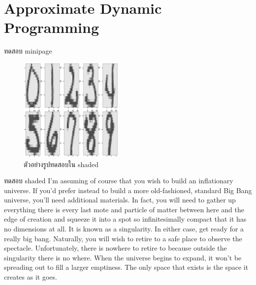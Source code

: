 \chapter{Approximate Dynamic Programming}
\label{chapter: ADP}





\begin{minipage}{5in} 
ทดสอบ minipage
\end{minipage}



%
\begin{figure}
\begin{center}
\includegraphics[width=2.0in]
{01Intro/zipdigits.eps}
\end{center}
\caption{ตัวอย่างรูปทดสอบใน shaded}
\end{figure}
%

\begin{shaded}
ทดสอบ shaded
I’m assuming of course that you wish to build an inflationary universe. If you’d prefer instead to build a more old-fashioned, standard Big Bang universe, you’ll need additional materials. In fact, you will need to gather up everything there is every last mote and particle of matter between here and the edge of creation and squeeze it into a spot so infinitesimally compact that it has no dimensions at all. It is known as a singularity.
In either case, get ready for a really big bang. Naturally, you will wish to retire to a safe place to observe the spectacle. Unfortunately, there is nowhere to retire to because outside the singularity there is no where. When the universe begins to expand, it won’t be spreading out to fill a larger emptiness. The only space that exists is the space it creates as it goes.
\end{shaded}

